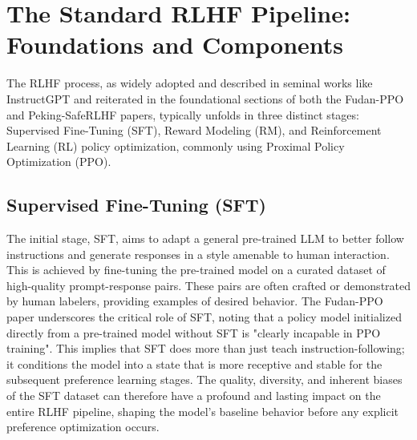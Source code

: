 \documentclass{article} %
\begin{document}
\section{The Standard RLHF Pipeline: Foundations and Components}
\label{sec:standard_rlhf}

The RLHF process, as widely adopted and described in seminal works like InstructGPT \cite{Ouyang2022InstructGPT} and reiterated in the foundational sections of both the Fudan-PPO \cite{Zheng2023PPO} and Peking-SafeRLHF \cite{Dai2023SafeRLHF} papers, typically unfolds in three distinct stages: Supervised Fine-Tuning (SFT), Reward Modeling (RM), and Reinforcement Learning (RL) policy optimization, commonly using Proximal Policy Optimization (PPO).

\subsection{Supervised Fine-Tuning (SFT)}
The initial stage, SFT, aims to adapt a general pre-trained LLM to better follow instructions and generate responses in a style amenable to human interaction. This is achieved by fine-tuning the pre-trained model on a curated dataset of high-quality prompt-response pairs. These pairs are often crafted or demonstrated by human labelers, providing examples of desired behavior. \cite{Ouyang2022InstructGPT} The Fudan-PPO paper underscores the critical role of SFT, noting that a policy model initialized directly from a pre-trained model without SFT is "clearly incapable in PPO training". \cite{Zheng2023PPO} This implies that SFT does more than just teach instruction-following; it conditions the model into a state that is more receptive and stable for the subsequent preference learning stages. The quality, diversity, and inherent biases of the SFT dataset can therefore have a profound and lasting impact on the entire RLHF pipeline, shaping the model's baseline behavior before any explicit preference optimization occurs.
\end{document}
